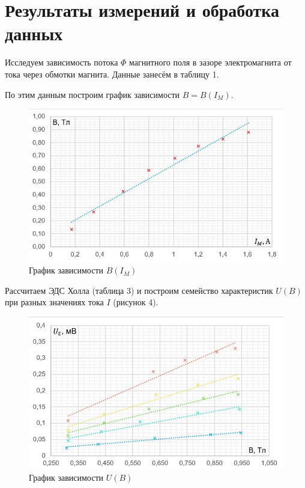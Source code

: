\documentclass[a4paper]{article}
\theoremstyle{definition}
\theoremstyle{remark}
\begin{document}
\section{Результаты измерений и обработка данных}

    Исследуем зависимость потока $\Phi$ магнитного поля в зазоре электромагнита от тока через обмотки магнита. Данные занесём в таблицу 1. \medskip

    По этим данным построим график зависимости $B = B(I_M)$.

    \newpage

    \begin{figure}[h!]
        \centering
        \includegraphics[width = 320pt]{image/graph1.jpg}
        \caption{График зависимости $B(I_M)$}
    \end{figure}

    Рассчитаем ЭДС Холла (таблица 3) и построим семейство характеристик $U(B)$ при разных значениях тока $I$ (рисунок 4).

    \begin{figure}[h!]
        \centering
        \includegraphics[width = 320pt]{image/graph2.jpg}
        \caption{График зависимости $U(B)$}
    \end{figure}
\end{document}
